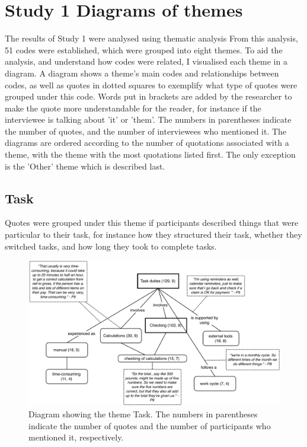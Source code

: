 \chapter{Study 1 Diagrams of themes}\label{ch:S1_Diagrams}
The results of Study 1 were analysed using thematic analysis From this analysis, 51 codes were established, which were grouped into eight themes. To aid the analysis, and understand how codes were related, I visualised each theme in a diagram. A diagram shows a theme's main codes and relationships between codes, as well as quotes in dotted squares to exemplify what type of quotes were grouped under this code. Words put in brackets are added by the researcher to make the quote more understandable for the reader, for instance if the interviewee is talking about 'it' or 'them'. The numbers in parentheses indicate the number of quotes, and the number of interviewees who mentioned it. The diagrams are ordered according to the number of quotations associated with a theme, with the theme with the most quotations listed first. The only exception is the 'Other' theme which is described last.

\newpage

\section{Task}
Quotes were grouped under this theme if participants described things that were particular to their task, for instance how they structured their task, whether they switched tasks, and how long they took to complete tasks.

\begin{figure}[!ht]
\centering
\includegraphics[width=\textwidth]{images/ch12/Task.pdf}
\caption[Study 1 Task diagram]{Diagram showing the theme Task. The numbers in parentheses indicate the number of quotes and the number of participants who mentioned it, respectively.}
\vspace{-9pt}
\label{fig:ch3_task}
\end{figure}

